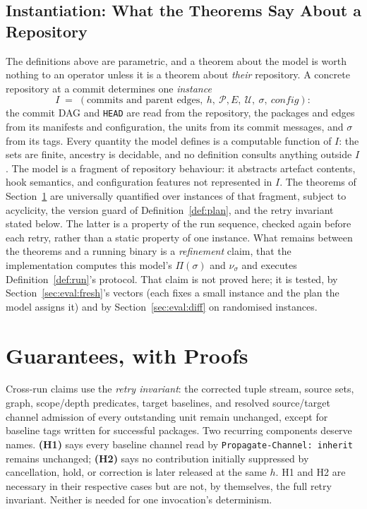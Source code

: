 \documentclass[sigconf,nonacm]{acmart}
\newcommand{\code}[1]{\texttt{#1}}
\begin{document}
\subsection{Instantiation: What the Theorems Say About a Repository}
\label{sec:model:inst}

The definitions above are parametric, and a theorem about the model
is worth nothing to an operator unless it is a theorem about
\emph{their} repository. A concrete repository at a commit determines
one \emph{instance}
\[
  I \;=\; (\text{commits and parent edges},\ h,\
           \mathcal{P}, E,\ \mathcal{U},\ \sigma,\ \mathit{config}):
\]
the commit DAG and \code{HEAD} are read from the repository, the
packages and edges from its manifests and configuration, the units
from its commit messages, and $\sigma$ from its tags. Every quantity
the model defines is a computable function of $I$: the sets are
finite, ancestry is decidable, and no definition consults anything
outside $I$. The model is a fragment of repository behaviour: it abstracts
artefact contents, hook semantics, and configuration features not represented
in $I$. The theorems of Section~\ref{sec:guarantees} are universally
quantified over instances of that fragment, subject to acyclicity, the
version guard of Definition~\ref{def:plan}, and the retry invariant stated
below. The latter is a property of the run sequence, checked again before
each retry, rather than a static property of one instance. What remains between the theorems and a running binary is a
\emph{refinement} claim, that the implementation computes this
model's $\Pi(\sigma)$ and $\nu_\sigma$ and executes
Definition~\ref{def:run}'s protocol. That claim is not proved here;
it is tested, by Section~\ref{sec:eval:fresh}'s vectors (each
fixes a small instance and the plan the model assigns it) and by
Section~\ref{sec:eval:diff} on randomised instances.

\section{Guarantees, with Proofs}
\label{sec:guarantees}

Cross-run claims use the \emph{retry invariant}: the corrected tuple
stream, source sets, graph, scope/depth predicates, target baselines, and
resolved source/target channel admission of every outstanding unit remain
unchanged, except for baseline tags written for successful packages.
Two recurring components deserve names. \textbf{(H1)} says every baseline
channel read by \code{Propagate-Channel: inherit} remains unchanged;
\textbf{(H2)} says no contribution initially suppressed by cancellation,
hold, or correction is later released at the same $h$. H1 and H2 are
necessary in their respective cases but are not, by themselves, the full
retry invariant. Neither is needed for one invocation's determinism.
\end{document}
